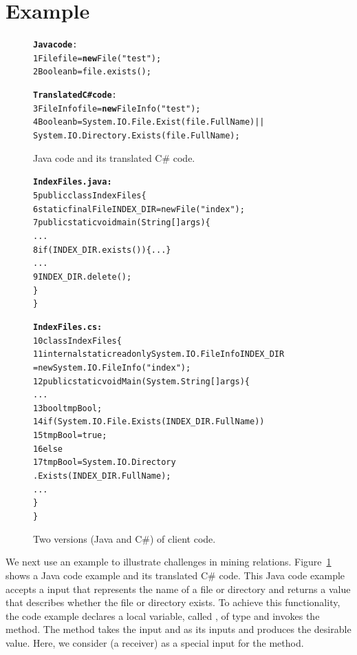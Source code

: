 \section{Example}
\label{sec:example}

\begin{figure}[t]
\begin{CodeOut}
\begin{alltt}
\textbf{Java code}:
1  File file = \textbf{new} File("test");
2  Boolean b = file.exists();

\textbf{Translated C\# code}:
3  FileInfo file = \textbf{new} FileInfo("test");
4  Boolean b = System.IO.File.Exist(file.FullName)||
           System.IO.Directory.Exists(file.FullName);
\end{alltt}
\end{CodeOut}\vspace*{-4ex}
\caption{\label{fig:challenge}Java code and its translated C\# code.}%
\end{figure}
\begin{figure}[t]
\begin{CodeOut}\vspace*{-1ex}
\begin{alltt}
  \textbf{IndexFiles.java:}
5 public class IndexFiles \{
6   static final File INDEX_DIR = new File("index");
7   public static void main(String[] args) \{
      ...
8     if (INDEX_DIR.exists()) \{...\}
      ...
9       INDEX_DIR.delete();
    \}
  \}

  \textbf{IndexFiles.cs:}
10 class IndexFiles\{
11   internal static readonly System.IO.FileInfo INDEX_DIR
          = new System.IO.FileInfo("index");
12   public static void  Main(System.String[] args)\{
      ...
13     bool tmpBool;
14     if (System.IO.File.Exists(INDEX_DIR.FullName))
15       tmpBool = true;
16    else
17       tmpBool = System.IO.Directory
                         .Exists(INDEX_DIR.FullName);
      ...
    \}
 \}
\end{alltt}
\end{CodeOut}\vspace*{-4ex}
\caption{\label{fig:clientcode} Two versions (Java and C\#) of
client code.}\vspace*{-2ex}
\end{figure}

We next use an example to illustrate challenges in mining relations. Figure~\ref{fig:challenge} shows a
Java code example and its translated C\# code. This Java code
example accepts a  input that represents the name of a
file or directory and returns a  value that
describes whether the file or directory exists. To achieve this functionality, the
code example declares a local variable, called , of
type  and invokes the  method. The
method takes the  input and  as its
inputs and produces the desirable  value. Here, we
consider  (a receiver) as a special input for
the  method.

